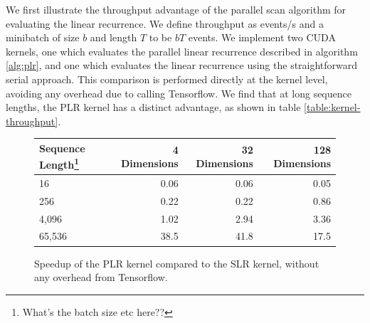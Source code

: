 \documentclass{article}
\begin{document}
We first illustrate the throughput advantage of the parallel scan algorithm for
evaluating the linear recurrence. We define throughput as events/s and a
minibatch of size $b$ and length $T$ to be $bT$ events. We implement two CUDA
kernels, one which evaluates the parallel linear recurrence described in
algorithm \ref{alg:plr}, and one which evaluates the linear recurrence using the
straightforward serial approach. This comparison is performed directly at the
kernel level, avoiding any overhead due to calling Tensorflow. We find that at
long sequence lengths, the PLR kernel has a distinct
advantage, as shown in table \ref{table:kernel-throughput}.

\begin{figure}
\begin{center}
  \begin{tabular}{lrrr}
    \label{table:rnn-throughput}
Sequence Length\footnote{What's the batch size etc here??} & 4 Dimensions & 32 Dimensions & 128 Dimensions \\
\hline
16 & 0.06 & 0.06 & 0.05\\ 
256 & 0.22 & 0.22 & 0.86\\ 
4,096 & 1.02 & 2.94 & 3.36\\ 
65,536 & 38.5 & 41.8 & 17.5\\
  \end{tabular}  
    \end{center}
    \caption{Speedup of the PLR kernel compared to the SLR kernel, without any
    overhead from Tensorflow.}    
  \end{figure}
  
\end{document}
